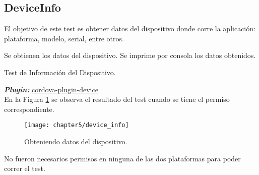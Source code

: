 \subsection{DeviceInfo}
El objetivo de este test es obtener datos del dispositivo donde corre la aplicación: plataforma, modelo, serial, entre otros.\\
\begin{algorithm}
	\begin{algorithmic}[1]
		\STATE Se obtienen los datos del dispositivo.
		\STATE Se imprime por consola los datos obtenidos.
	\end{algorithmic}
	\caption{Test de Información del Dispositivo.}\label{alg:chap5_test_info}
\end{algorithm}
\textbf{\emph{Plugin:}} \href{https://www.npmjs.com/package/cordova-plugin-device}{cordova-plugin-device}\\
En la Figura \ref{fig:ch05:device-info} se observa el resultado del test cuando se tiene el permiso correspondiente.\\
\begin{figure}[hbtp]
   \centering
	\texttt{[image: chapter5/device\_info]}
	\caption{Obteniendo datos del dispositivo.}
	\label{fig:ch05:device-info}
\end{figure}
No fueron necesarios permisos en ninguna de las dos plataformas para poder correr el test.

